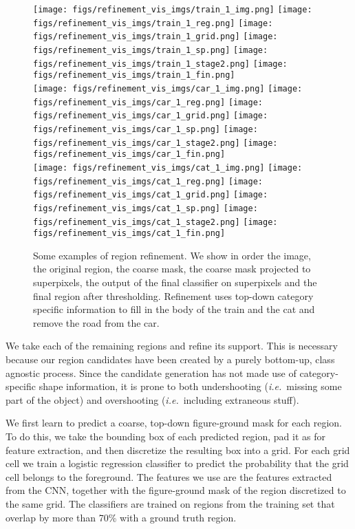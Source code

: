 \documentclass[runningheads]{llncs}
\newcommand\ie{\emph{i.e.}\ }
\begin{document}
\begin{figure}
\texttt{[image: figs/refinement\_vis\_imgs/train\_1\_img.png]}
\texttt{[image: figs/refinement\_vis\_imgs/train\_1\_reg.png]}
\texttt{[image: figs/refinement\_vis\_imgs/train\_1\_grid.png]}
\texttt{[image: figs/refinement\_vis\_imgs/train\_1\_sp.png]}
\texttt{[image: figs/refinement\_vis\_imgs/train\_1\_stage2.png]}
\texttt{[image: figs/refinement\_vis\_imgs/train\_1\_fin.png]}\\
\texttt{[image: figs/refinement\_vis\_imgs/car\_1\_img.png]}
\texttt{[image: figs/refinement\_vis\_imgs/car\_1\_reg.png]}
\texttt{[image: figs/refinement\_vis\_imgs/car\_1\_grid.png]}
\texttt{[image: figs/refinement\_vis\_imgs/car\_1\_sp.png]}
\texttt{[image: figs/refinement\_vis\_imgs/car\_1\_stage2.png]}
\texttt{[image: figs/refinement\_vis\_imgs/car\_1\_fin.png]}\\
\texttt{[image: figs/refinement\_vis\_imgs/cat\_1\_img.png]}
\texttt{[image: figs/refinement\_vis\_imgs/cat\_1\_reg.png]}
\texttt{[image: figs/refinement\_vis\_imgs/cat\_1\_grid.png]}
\texttt{[image: figs/refinement\_vis\_imgs/cat\_1\_sp.png]}
\texttt{[image: figs/refinement\_vis\_imgs/cat\_1\_stage2.png]}
\texttt{[image: figs/refinement\_vis\_imgs/cat\_1\_fin.png]}
\caption{Some examples of region refinement. We show in order the image, the original region, the coarse  mask, the coarse mask projected to superpixels, the output of the final classifier on superpixels and the final region after thresholding. Refinement uses top-down category specific information to fill in the body of the train and the cat and remove the road from the car.}
\label{fig:refinement}
\end{figure}
We take each of the remaining regions and refine its support. This is necessary because our region candidates have been created by a purely bottom-up, class agnostic process. Since the candidate generation has not made use of category-specific shape information, it is prone to both undershooting (\ie missing some part of the object) and overshooting (\ie including  extraneous stuff).

We first learn to predict a coarse, top-down figure-ground mask for each region. To do this, we take the bounding box of each predicted region, pad it as for feature extraction, and then discretize the resulting box into a  grid. For each grid cell we train a logistic regression classifier to predict the probability that the grid cell belongs to the foreground. The features we use are the features extracted from the CNN, together with the figure-ground mask of the region discretized to the same  grid. The classifiers are trained on regions from the training set that overlap by more than 70\% with a ground truth region. 
\end{document}
